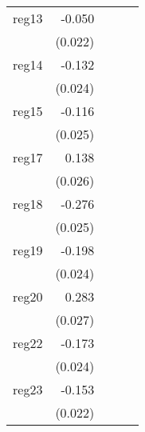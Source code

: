 {\begin{longtable}{l*{4}{D{.}{.}{-1}}}
\addlinespace
reg13       &      -0.050\sym{*}  &                     &                     &                     \\
            &     (0.022)         &                     &                     &                     \\
\addlinespace
reg14       &      -0.132\sym{***}&                     &                     &                     \\
            &     (0.024)         &                     &                     &                     \\
\addlinespace
reg15       &      -0.116\sym{***}&                     &                     &                     \\
            &     (0.025)         &                     &                     &                     \\
\addlinespace
reg17       &       0.138\sym{***}&                     &                     &                     \\
            &     (0.026)         &                     &                     &                     \\
\addlinespace
reg18       &      -0.276\sym{***}&                     &                     &                     \\
            &     (0.025)         &                     &                     &                     \\
\addlinespace
reg19       &      -0.198\sym{***}&                     &                     &                     \\
            &     (0.024)         &                     &                     &                     \\
\addlinespace
reg20       &       0.283\sym{***}&                     &                     &                     \\
            &     (0.027)         &                     &                     &                     \\
\addlinespace
reg22       &      -0.173\sym{***}&                     &                     &                     \\
            &     (0.024)         &                     &                     &                     \\
\addlinespace
reg23       &      -0.153\sym{***}&                     &                     &                     \\
            &     (0.022)         &                     &                     &                     \\

\end{longtable}}
